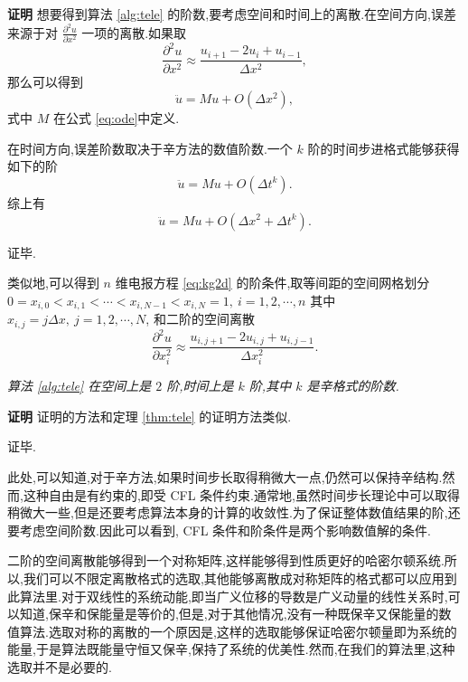 {\textbf{证明}} 想要得到算法 \ref{alg:tele} 的阶数,要考虑空间和时间上的离散.在空间方向,误差来源于对 $\frac{\partial^2
u}{\partial x^2}$ 一项的离散.如果取
\begin{equation*}
\frac{\partial^2u}{\partial x^2}\approx \frac{u_{i+1}-2u_i+u_{i-1}}{\Delta x^2},
\end{equation*}
那么可以得到
\begin{equation*}
\ddot{u}=Mu+O(\Delta x^2),
\end{equation*}
式中 $M$ 在公式 \eqref{eq:ode}中定义.

在时间方向,误差阶数取决于辛方法的数值阶数.一个 $k$ 阶的时间步进格式能够获得如下的阶
\begin{equation*}
\ddot{u}=Mu+O(\Delta t^k).
\end{equation*}
综上有
\begin{equation*}
\ddot{u}=Mu+O(\Delta x^2+ \Delta t^k).
\end{equation*}

证毕.

类似地,可以得到 $n$ 维电报方程 \eqref{eq:kg2d} 的阶条件,取等间距的空间网格划分
$0=x_{i,0}<x_{i,1}<\cdots<x_{i,N-1}<x_{i,N}=1,~i=1,2,\cdots,n$ 其中
$x_{i,j}=j\Delta x,~j = 1,2,\cdots,N$, 和二阶的空间离散
\begin{equation*}
\frac{\partial^2u}{\partial x_i^2}\approx \frac{u_{i,j+1}-2u_{i,j}+u_{i,j-1}}{\Delta x_i^2}.
\end{equation*}

\begin{theorem}
\emph{算法 \ref{alg:tele} 在空间上是 $2$ 阶,时间上是 $k$ 阶,其中 $k$ 是辛格式的阶数.}
\end{theorem}

{\textbf{证明}} 证明的方法和定理 \ref{thm:tele} 的证明方法类似.

证毕.

此处,可以知道,对于辛方法,如果时间步长取得稍微大一点,仍然可以保持辛结构.然而,这种自由是有约束的,即受 CFL 条件约束.通常地,虽然时间步长理论中可以取得稍微大一些,但是还要考虑算法本身的计算的收敛性.为了保证整体数值结果的阶,还要考虑空间阶数.因此可以看到, CFL 条件和阶条件是两个影响数值解的条件.

二阶的空间离散能够得到一个对称矩阵,这样能够得到性质更好的哈密尔顿系统.所以,我们可以不限定离散格式的选取,其他能够离散成对称矩阵的格式都可以应用到此算法里.对于双线性的系统动能,即当广义位移的导数是广义动量的线性关系时,可以知道,保辛和保能量是等价的,但是,对于其他情况,没有一种既保辛又保能量的数值算法.选取对称的离散的一个原因是,这样的选取能够保证哈密尔顿量即为系统的能量,于是算法既能量守恒又保辛,保持了系统的优美性.然而,在我们的算法里,这种选取并不是必要的.

